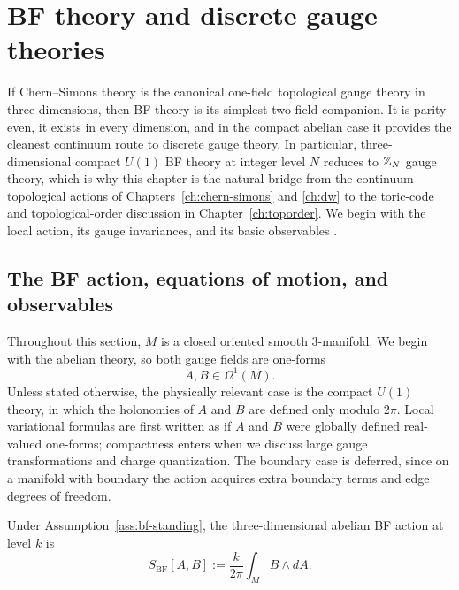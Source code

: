 \chapter{BF theory and discrete gauge theories}\label{ch:bf}

If Chern--Simons theory is the canonical one-field topological gauge theory in three dimensions, then BF theory is its simplest two-field companion. It is parity-even, it exists in every dimension, and in the compact abelian case it provides the cleanest continuum route to discrete gauge theory. In particular, three-dimensional compact $U(1)$ BF theory at integer level $N$ reduces to $\mathbb{Z}_N$ gauge theory, which is why this chapter is the natural bridge from the continuum topological actions of Chapters~\ref{ch:chern-simons} and \ref{ch:dw} to the toric-code and topological-order discussion in Chapter~\ref{ch:toporder}. We begin with the local action, its gauge invariances, and its basic observables \cite{Horowitz1989,BlauThompson1991}.

\section{The BF action, equations of motion, and observables}\label{sec:bf-action}

\begin{assumption}\label{ass:bf-standing}
Throughout this section, $M$ is a closed oriented smooth $3$-manifold. We begin with the abelian theory, so both gauge fields are one-forms
\begin{equation*}
A,B \in \Omega^1(M).
\end{equation*}
Unless stated otherwise, the physically relevant case is the compact $U(1)$ theory, in which the holonomies of $A$ and $B$ are defined only modulo $2\pi$. Local variational formulas are first written as if $A$ and $B$ were globally defined real-valued one-forms; compactness enters when we discuss large gauge transformations and charge quantization. The boundary case is deferred, since on a manifold with boundary the action acquires extra boundary terms and edge degrees of freedom.
\end{assumption}

\begin{definition}\label{def:bf-action}
Under Assumption~\ref{ass:bf-standing}, the three-dimensional abelian BF action at level $k$ is
\begin{equation}\label{eq:bf-action}
S_{\mathrm{BF}}[A,B]
:=
\frac{k}{2\pi}\int_M B\wedge dA.
\end{equation}
\end{definition}

